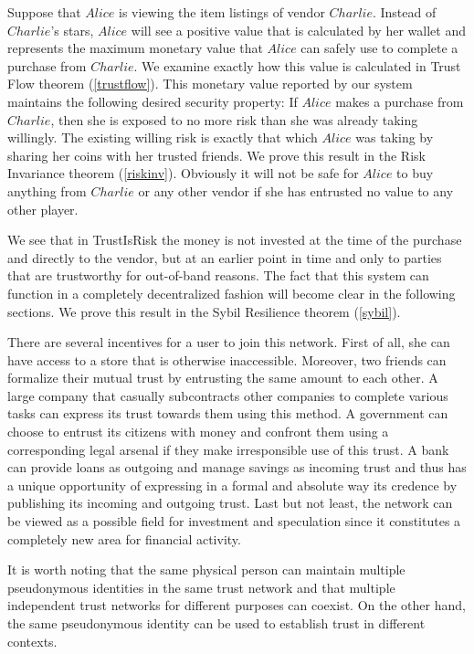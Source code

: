    Suppose that $Alice$ is viewing the item listings of vendor $Charlie$. Instead of $Charlie$'s stars, $Alice$ will see a
   positive value that is calculated by her wallet and represents the maximum monetary value that $Alice$ can safely use to
   complete a purchase from $Charlie$. We examine exactly how this value is calculated in Trust Flow theorem
   (\ref{trustflow}). This monetary value reported by our system maintains the following desired security property: If $Alice$
   makes a purchase from $Charlie$, then she is exposed to no more risk than she was already taking willingly. The existing
   willing risk is exactly that which $Alice$ was taking by sharing her coins with her trusted friends.
   We prove this result in the Risk Invariance theorem (\ref{riskinv}). Obviously it will not be safe for $Alice$
   to buy anything from $Charlie$ or any other vendor if she has entrusted no value to any other player.

   We see that in TrustIsRisk the money is not invested at the time of the purchase and directly to the vendor, but at an
   earlier point in time and only to parties that are trustworthy for out-of-band reasons. The fact that this system can
   function in a completely decentralized fashion will become clear in the following sections. We prove this result in the
   Sybil Resilience theorem (\ref{sybil}).

   There are several incentives for a user to join this network. First of all, she can have access to a store that is
   otherwise inaccessible. Moreover, two friends can formalize their mutual trust by entrusting the same amount to each
   other. A large company that casually subcontracts other companies to complete various tasks can express its trust
   towards them using this method. A government can choose to entrust its citizens with money and confront them using a
   corresponding legal arsenal if they make irresponsible use of this trust. A bank can provide loans as outgoing and
   manage savings as incoming trust and thus has a unique opportunity of expressing in a formal and absolute way its
   credence by publishing its incoming and outgoing trust. Last but not least, the network can be viewed as a possible
   field for investment and speculation since it constitutes a completely new area for financial activity.

   It is worth noting that the same physical person can maintain multiple pseudonymous identities in the same trust network
   and that multiple independent trust networks for different purposes can coexist. On the other hand, the same
   pseudonymous identity can be used to establish trust in different contexts.

